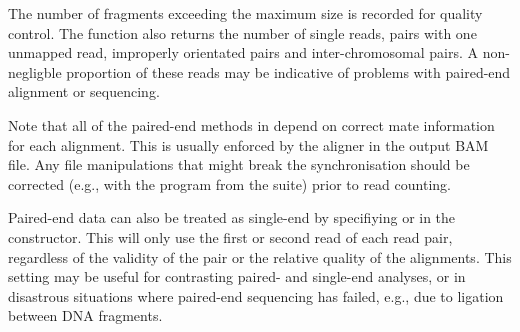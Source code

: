 \documentclass{report}\usepackage[]{graphicx}\usepackage[usenames,dvipsnames]{color}
\newcommand{\hlnum}[1]{\textcolor[rgb]{0.816,0.125,0.439}{#1}}%
\newcommand{\hlstr}[1]{\textcolor[rgb]{0.251,0.627,0.251}{#1}}%
\newcommand{\hlopt}[1]{\textcolor[rgb]{0,0,0}{#1}}%
\newcommand{\hlstd}[1]{\textcolor[rgb]{0.251,0.251,0.251}{#1}}%
\newcommand{\hlkwb}[1]{\textcolor[rgb]{0,0,0}{#1}}%
\newcommand{\hlkwc}[1]{\textcolor[rgb]{0.251,0.251,0.251}{#1}}%
\newcommand{\hlkwd}[1]{\textcolor[rgb]{0.878,0.439,0.125}{#1}}%
\newenvironment{knitrout}{}{} %
\begin{document}
The number of fragments exceeding the maximum size is recorded for quality control. 
The  function also returns the number of single reads, pairs with one unmapped read, improperly orientated pairs and inter-chromosomal pairs.
A non-negligble proportion of these reads may be indicative of problems with paired-end alignment or sequencing. 

\begin{knitrout}
\color{fgcolor}
\end{knitrout}

Note that all of the paired-end methods in  depend on correct mate information for each alignment.
This is usually enforced by the aligner in the output BAM file.
Any file manipulations that might break the synchronisation should be corrected 
(e.g., with the  program from the  suite) prior to read counting.

Paired-end data can also be treated as single-end by specifiying  or  in the  constructor. 
This will only use the first or second read of each read pair, regardless of the validity of the pair or the relative quality of the alignments.
This setting may be useful for contrasting paired- and single-end analyses, or in disastrous situations where paired-end sequencing has failed, e.g., due to ligation between DNA fragments.

\begin{knitrout}
\color{fgcolor}
\end{knitrout}
\end{document}
